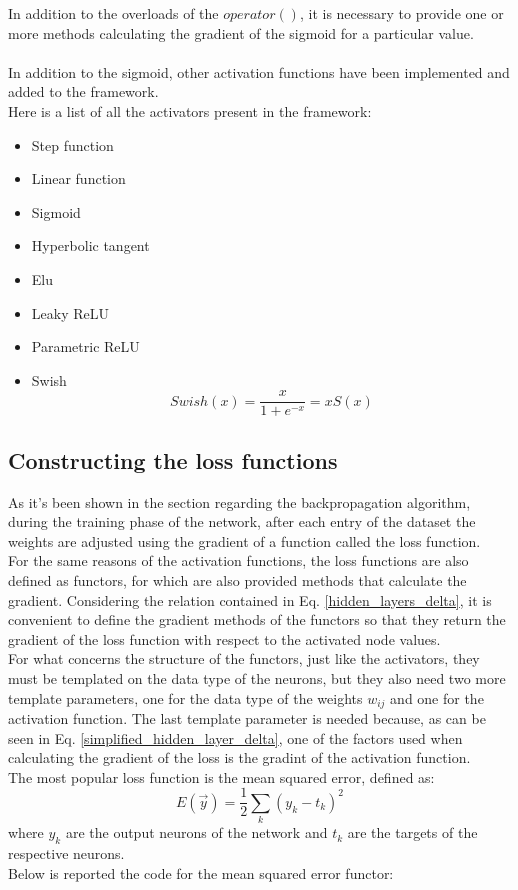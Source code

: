 \documentclass[12pt]{article}
\begin{document}
\noindent In addition to the overloads of the $operator()$, it is necessary to provide one or more methods calculating
the gradient of the sigmoid for a particular value. \\ \\
In addition to the sigmoid, other activation functions have been implemented and added to the framework. \\
Here is a list of all the activators present in the framework:
\begin{itemize}
  \item Step function
  \item Linear function
  \item Sigmoid 
  \item Hyperbolic tangent
  \item Elu
  \item Leaky ReLU
  \item Parametric ReLU
  \item Swish
  $$
	Swish(x) = \frac{x}{1 + e^{-x}} = x S(x)
  $$	
\end{itemize}

\subsection{Constructing the loss functions}
As it's been shown in the section regarding the backpropagation algorithm, during the training phase of the
network, after each entry of the dataset the weights are adjusted using the gradient of a function called 
the loss function. \\
For the same reasons of the activation functions, the loss functions are also defined as functors, for which 
are also provided methods that calculate the gradient. Considering the relation contained in Eq. 
\ref{hidden_layers_delta}, it is convenient to define the gradient methods of the functors so that they 
return the gradient of the loss function with respect to the activated node values. \\
For what concerns the structure of the functors, just like the activators, they must be templated on the 
data type of the neurons, but they also need two more template parameters, one for the data type of the 
weights $w_{ij}$ and one for the activation function. The last template parameter is needed because, as 
can be seen in Eq. \ref{simplified_hidden_layer_delta}, one of the factors used when calculating the gradient
of the loss is the gradint of the activation function. \\
The most popular loss function is the mean squared error, defined as:
\begin{equation}
  E(\vec{y}) = \frac{1}{2}\sum_k (y_k - t_k)^2
\end{equation}
where $y_k$ are the output neurons of the network and $t_k$ are the targets of the respective neurons. \\
Below is reported the code for the mean squared error functor:
\end{document}
